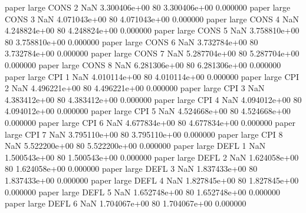             paper      large     CONS                 2                  NaN 3.300406e+00 80   3.300406e+00           0.000000
            paper      large     CONS                 3                  NaN 4.071043e+00 80   4.071043e+00           0.000000
            paper      large     CONS                 4                  NaN 4.248824e+00 80   4.248824e+00           0.000000
            paper      large     CONS                 5                  NaN 3.758810e+00 80   3.758810e+00           0.000000
            paper      large     CONS                 6                  NaN 3.732784e+00 80   3.732784e+00           0.000000
            paper      large     CONS                 7                  NaN 5.287704e+00 80   5.287704e+00           0.000000
            paper      large     CONS                 8                  NaN 6.281306e+00 80   6.281306e+00           0.000000
            paper      large      CPI                 1                  NaN 4.010114e+00 80   4.010114e+00           0.000000
            paper      large      CPI                 2                  NaN 4.496221e+00 80   4.496221e+00           0.000000
            paper      large      CPI                 3                  NaN 4.383412e+00 80   4.383412e+00           0.000000
            paper      large      CPI                 4                  NaN 4.094012e+00 80   4.094012e+00           0.000000
            paper      large      CPI                 5                  NaN 4.524668e+00 80   4.524668e+00           0.000000
            paper      large      CPI                 6                  NaN 4.677834e+00 80   4.677834e+00           0.000000
            paper      large      CPI                 7                  NaN 3.795110e+00 80   3.795110e+00           0.000000
            paper      large      CPI                 8                  NaN 5.522200e+00 80   5.522200e+00           0.000000
            paper      large     DEFL                 1                  NaN 1.500543e+00 80   1.500543e+00           0.000000
            paper      large     DEFL                 2                  NaN 1.624058e+00 80   1.624058e+00           0.000000
            paper      large     DEFL                 3                  NaN 1.837433e+00 80   1.837433e+00           0.000000
            paper      large     DEFL                 4                  NaN 1.827845e+00 80   1.827845e+00           0.000000
            paper      large     DEFL                 5                  NaN 1.652748e+00 80   1.652748e+00           0.000000
            paper      large     DEFL                 6                  NaN 1.704067e+00 80   1.704067e+00           0.000000
